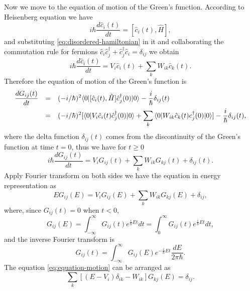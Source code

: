 \documentclass{book}
\newcommand{\bra}[1]{{\langle#1|}}
\newcommand{\ket}[1]{{|#1\rangle}}
\numberwithin{equation}{section}
\begin{document}
Now we move to the equation of motion of the Green's
function. According to Heisenberg equation we have
\begin{equation}
  i\hbar\frac{d\hat{c}_i(t)}{dt}=[\hat{c}_i(t),\hat{H}],
\end{equation}
and substituting \eqref{eq:disordered-hamiltonian} in it and
collaborating the commutation rule for fermions
$\hat{c}_i\hat{c}_j^\dagger+\hat{c}_j^\dagger\hat{c}_i=\delta_{ij}$ we
obtain
\begin{equation}
  i\hbar\frac{d\hat{c}_i(t)}{dt}=V_i\hat{c}_i(t)+\sum_{k}W_{ik}\hat{c}_k(t).
\end{equation}
Therefore the equation of motion of the Green's function is
\begin{equation}
  \begin{array}{rcl}
    \displaystyle\frac{dG_{ij}(t)}{dt}&=&\displaystyle(-i/\hbar)^2
    \bra{0}[\hat{c}_i(t),\hat{H}]\hat{c}_j^\dagger(0)\ket{0}
    -\frac{i}{\hbar}\delta_{ij}(t)\\\vbox to 18pt{}
    &=&\displaystyle(-i/\hbar)^2[\bra{0}V_i\hat{c}_i(t)\hat{c}_j^\dagger(0)\ket{0}
    +\sum_{k}\bra{0}W_{ik}\hat{c}_k(t)c^\dagger_j(0)\ket{0}]-
    \frac{i}{\hbar}\delta_{ij}(t),
  \end{array}
\end{equation}
where the delta function $\delta_{ij}(t)$ comes from the discontinuity
of the Green's function at time $t=0$, thus we have for $t\ge0$
\begin{equation}
  i\hbar\frac{dG_{ij}(t)}{dt}=V_iG_{ij}(t)+\sum_{k}W_{ik}G_{kj}(t)+\delta_{ij}(t).
\end{equation}
Apply Fourier transform on both sides we have the equation in energy
representation as
\begin{equation}
  \label{eq:equation-motion}
  EG_{ij}(E)=V_iG_{ij}(E)+\sum_kW_{ik}G_{kj}(E)+\delta_{ij},
\end{equation}
where, since $G_{ij}(t)=0$ when $t<0$,
\begin{equation}
  G_{ij}(E)=\int_{-\infty}^\infty G_{ij}(t)e^{\frac{i}{\hbar}Et}dt=
  \int_0^\infty G_{ij}(t)e^{\frac{i}{\hbar}Et}dt,
\end{equation}
and the inverse Fourier transform is
\begin{equation}
  G_{ij}(t)=\int_{-\infty}^\infty G_{ij}(E)e^{-\frac{i}{\hbar}Et}\frac{dE}{2\pi\hbar}.
\end{equation}
The equation \eqref{eq:equation-motion} can be arranged as
\begin{equation}
  \label{eq:equation-motion-1}
  \sum_k[(E-V_i)\delta_{ik}-W_{ik}]G_{kj}(E)=\delta_{ij}.
\end{equation}
\end{document}
